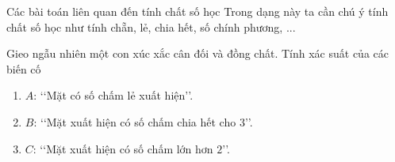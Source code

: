 
\begin{dang}{Các bài toán liên quan đến tính chất số học}
	Trong dạng này ta cần chú ý tính chất số học như tính chẵn, lẻ, chia hết, số chính phương, ...
\end{dang}

\viduminhhoa
\setcounter{vd}{0}
\begin{vd}%
	Gieo ngẫu nhiên một con xúc xắc cân đối và đồng chất. Tính xác suất của các biến cố
	\begin{enumerate}
		\item $A$: \lq\lq  Mặt có số chấm lẻ xuất hiện\rq\rq.
		\item $B$: \lq\lq  Mặt xuất hiện có số chấm chia hết cho $3$\rq\rq.
		\item $C$: \lq\lq  Mặt xuất hiện có số chấm lớn hơn $2$\rq\rq.
	\end{enumerate}
\end{vd}


